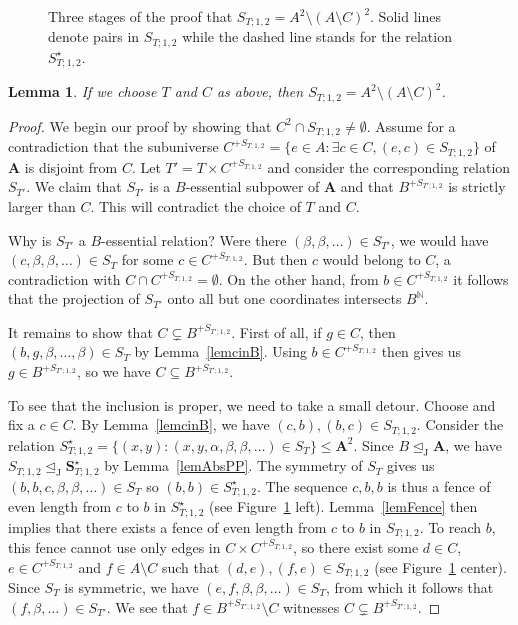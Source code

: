 \documentclass{amsart}
\theoremstyle{plain}
\newtheorem{lemma}[theorem]{Lemma}
\theoremstyle{definition}
\begin{document}
\begin{figure}
\begin{center}
  \end{center}
  \caption{Three stages of the proof that $S_{T;1,2}=A^2\setminus(A\setminus
    C)^2$. Solid lines denote pairs in $S_{T;1,2}$ while the dashed
  line stands for the relation $S_{T;1,2}^\star$.}\label{figS}
\end{figure}

\begin{lemma}\label{lemBinaryblocker}
  If we choose $T$ and $C$ as above, then $S_{T;1,2}=A^2\setminus(A\setminus C)^2$.
\end{lemma}
\begin{proof}
  We begin our proof by showing that $C^2\cap S_{T;1,2}\neq \emptyset$. Assume for a
  contradiction
  that the subuniverse $C^{+S_{T;1,2}}=\{e\in A \colon \exists c\in C,
  (e,c)\in S_{T;1,2}\}$ of ${{\mathbf{A}}}$ is disjoint from $C$. 
	Let $T'=T\times C^{+S_{T;1,2}}$ and consider the corresponding relation
  $S_{T'}$. We claim that $S_{T'}$ is
  a $B$-essential subpower of ${{\mathbf{A}}}$ and that $B^{+S_{T';1,2}}$ is strictly larger than
  $C$. This will contradict the choice of $T$ and $C$.

  Why is $S_{T'}$ a $B$-essential relation? Were there $(\beta,\beta,\dots)\in
  S_{T'}$, we would have
  $(c,\beta,\beta,\dots)\in S_T$ for some $c\in C^{+S_{T;1,2}}$. But then $c$
  would belong to $C$, a contradiction with $C\cap C^{+S_{T;1,2}}=\emptyset$. On the other hand, from $b \in C^{+S_{T;1,2}}$ it follows that  the projection of $S_{T'}$ onto all but one coordinates intersects $B^{{\mathbb N}}$. 

  It remains to show that $C\subsetneq B^{+S_{T';1,2}}$. First of all, if $g\in C$, then
  $(b,g,\beta,\dots,\beta)\in S_{T}$ by Lemma~\ref{lemcinB}. Using $b\in
  C^{+S_{T;1,2}}$ then gives us $g\in B^{+S_{T';1,2}}$, so we have $C\subseteq B^{+S_{T';1,2}}$. 

  To see that the inclusion is proper, we need to take a small detour. Choose
  and fix a $c\in C$. By Lemma~\ref{lemcinB}, we have $(c,b),(b,c)\in S_{T;1,2}$.
 Consider the relation
  $S_{T;1,2}^\star=\{(x,y) \colon (x,y,\alpha,\beta,\beta,\dots)\in S_T\} \leq {{\mathbf{A}}}^2$. 
	Since $B\operatorname{\trianglelefteq_J} {{\mathbf{A}}}$, we have
  $S_{T;1,2}\operatorname{\trianglelefteq_J} {\mathbf{{S}}}_{T;1,2}^\star$ by Lemma~\ref{lemAbsPP}. 
	The symmetry of $S_T$ gives us
  $(b,b,c,\beta,\beta,\dots)\in S_T$
  so $(b,b)\in S_{T;1,2}^\star$. The sequence $c,b,b$ is thus a fence
  of even length from $c$ to $b$ in $S_{T;1,2}^\star$ (see Figure~\ref{figS}
  left). Lemma~\ref{lemFence}
  then implies that there exists a fence of even length from $c$ to $b$ in $S_{T;1,2}$. 
  To reach $b$, this fence cannot use only edges in $C\times C^{+S_{T;1,2}}$, so
	there exist some $d\in C$, $e \in
	C^{+S_{T;1,2}}$ and $f\in A \setminus C$ such that $(d,e),(f,e)\in
	S_{T;1,2}$ (see Figure~\ref{figS} center). Since $S_T$ is symmetric, we
	have $(e,f,\beta,\beta,\dots)\in S_T$, from which it follows that
	$(f,\beta,\dots)\in S_{T'}$. We see that $f\in B^{+S_{T';1,2}}\setminus C$ witnesses
	$C\subsetneq B^{+S_{T';1,2}}$.  


\end{proof}
\end{document}
